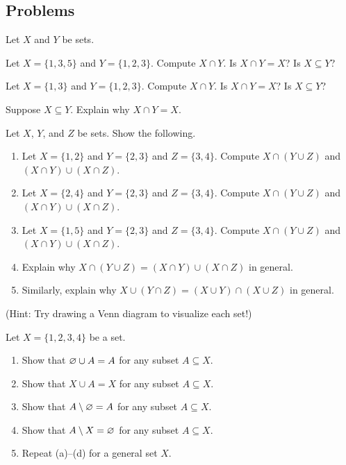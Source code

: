 \documentclass[../notes.tex]{subfiles}
\begin{document}
\subsection{Problems}
\begin{homework}
    Let $X$ and $Y$ be sets.
    \begin{listalph}
        \item Let $X=\{1,3,5\}$ and $Y=\{1,2,3\}$. Compute $X\cap Y$. Is $X\cap Y=X$? Is $X\subseteq Y$?
        \item Let $X=\{1,3\}$ and $Y=\{1,2,3\}$. Compute $X\cap Y$. Is $X\cap Y=X$? Is $X\subseteq Y$?
        \item Suppose $X\subseteq Y$. Explain why $X\cap Y=X$.
    \end{listalph}
\end{homework}
\begin{homework}
    Let $X$, $Y$, and $Z$ be sets. Show the following.
    \begin{enumerate}[label=(\alph*)]
        \item Let $X=\{1,2\}$ and $Y=\{2,3\}$ and $Z=\{3,4\}$. Compute $X\cap (Y\cup Z)$ and $(X\cap Y)\cup(X\cap Z)$.
        \item Let $X=\{2,4\}$ and $Y=\{2,3\}$ and $Z=\{3,4\}$. Compute $X\cap (Y\cup Z)$ and $(X\cap Y)\cup(X\cap Z)$.
        \item Let $X=\{1,5\}$ and $Y=\{2,3\}$ and $Z=\{3,4\}$. Compute $X\cap (Y\cup Z)$ and $(X\cap Y)\cup(X\cap Z)$.
        \item Explain why $X \cap (Y \cup Z) = (X \cap Y) \cup (X \cap Z)$ in general.
        \item Similarly, explain why $X \cup (Y \cap Z) = (X \cup Y) \cap (X \cup Z)$ in general.
    \end{enumerate}
    (Hint: Try drawing a Venn diagram to visualize each set!)
\end{homework}
\begin{homework}
    Let $X=\{1,2,3,4\}$ be a set.
    \begin{enumerate}[label=(\alph*)]
        \item Show that $\varnothing\cup A=A$ for any subset $A\subseteq X$.
        \item Show that $X\cup A=X$ for any subset $A\subseteq X$.
        \item Show that $A\setminus\varnothing=A$ for any subset $A\subseteq X$.
        \item Show that $A\setminus X=\varnothing$ for any subset $A\subseteq X$.
        \item Repeat (a)--(d) for a general set $X$.
    \end{enumerate}
\end{homework}
\end{document}
